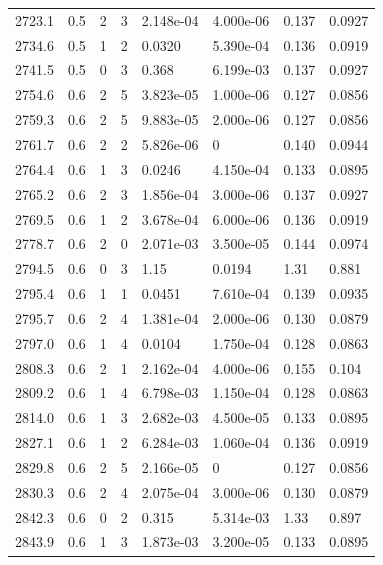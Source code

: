 \documentclass[preview]{standalone}
\begin{document}
{{{{{{{{{{{\begin{tabular}{L{1.2cm}C{1.2cm} C{0.3cm}C{0.5cm} C{1.4cm}C{1.4cm} C{1.4cm}C{1.4cm}}
  2723.1  &   0.5  & 2     &  3 &  2.148e-04  & 4.000e-06  & 0.137 &  0.0927   \\ 
  2734.6  &   0.5  & 1     &  2 &  0.0320  & 5.390e-04  & 0.136 &  0.0919   \\ 
  2741.5  &   0.5  & 0     &  3 &  0.368  & 6.199e-03  & 0.137 &  0.0927   \\ 
  2754.6  &   0.6  & 2     &  5 &  3.823e-05  & 1.000e-06  & 0.127 &  0.0856   \\ 
  2759.3  &   0.6  & 2     &  5 &  9.883e-05  & 2.000e-06  & 0.127 &  0.0856   \\ 
  2761.7  &   0.6  & 2     &  2 &  5.826e-06  & 0  & 0.140 &  0.0944   \\ 
  2764.4  &   0.6  & 1     &  3 &  0.0246  & 4.150e-04  & 0.133 &  0.0895   \\ 
  2765.2  &   0.6  & 2     &  3 &  1.856e-04  & 3.000e-06  & 0.137 &  0.0927   \\ 
  2769.5  &   0.6  & 1     &  2 &  3.678e-04  & 6.000e-06  & 0.136 &  0.0919   \\ 
  2778.7  &   0.6  & 2     &  0 &  2.071e-03  & 3.500e-05  & 0.144 &  0.0974   \\ 
  2794.5  &   0.6  & 0     &  3 &  1.15  & 0.0194  & 1.31 &  0.881   \\ 
  2795.4  &   0.6  & 1     &  1 &  0.0451  & 7.610e-04  & 0.139 &  0.0935   \\ 
  2795.7  &   0.6  & 2     &  4 &  1.381e-04  & 2.000e-06  & 0.130 &  0.0879   \\ 
  2797.0  &   0.6  & 1     &  4 &  0.0104  & 1.750e-04  & 0.128 &  0.0863   \\ 
  2808.3  &   0.6  & 2     &  1 &  2.162e-04  & 4.000e-06  & 0.155 &  0.104   \\ 
  2809.2  &   0.6  & 1     &  4 &  6.798e-03  & 1.150e-04  & 0.128 &  0.0863   \\ 
  2814.0  &   0.6  & 1     &  3 &  2.682e-03  & 4.500e-05  & 0.133 &  0.0895   \\ 
  2827.1  &   0.6  & 1     &  2 &  6.284e-03  & 1.060e-04  & 0.136 &  0.0919   \\ 
  2829.8  &   0.6  & 2     &  5 &  2.166e-05  & 0  & 0.127 &  0.0856   \\ 
  2830.3  &   0.6  & 2     &  4 &  2.075e-04  & 3.000e-06  & 0.130 &  0.0879   \\ 
  2842.3  &   0.6  & 0     &  2 &  0.315  & 5.314e-03  & 1.33 &  0.897   \\ 
  2843.9  &   0.6  & 1     &  3 &  1.873e-03  & 3.200e-05  & 0.133 &  0.0895   \\ 

\end{tabular}}}}}}}}}}}}
\end{document}
